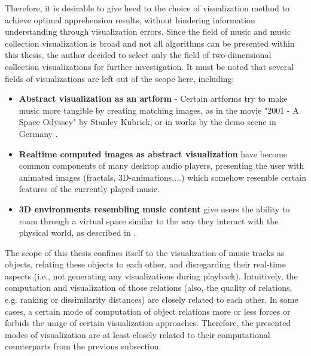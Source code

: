 Therefore, it is desirable to give heed to the choice of visualization method to achieve optimal apprehension results, without hindering information understanding through visualization errors.
Since the field of music and music collection visualization is broad and not all algorithms can be presented within this thesis, the author decided to select only the field of two-dimensional collection visualizations for further investigation. It must be noted that several fields of visualizations are left out of the scope here, including:

\begin{itemize}
	\item \textbf{Abstract visualization as an artform} - Certain artforms try to make music more tangible by creating matching images, as in the movie "2001 - A Space Odyssey" by Stanley Kubrick, or in works by the demo scene in Germany \cite{Scheib:2002}.
	\item \textbf{Realtime computed images as abstract visualization} have become common components of many desktop audio players, presenting the user with animated images (fractals, 3D-animations,...) which somehow resemble certain features of the currently played music.
	\item \textbf{3D environments resembling music content} give users the ability to roam through a virtual space similar to the way they interact with the physical world, as described in \cite{Dittenbach:2007}.
\end{itemize}

The scope of this thesis confines itself to the visualization of music tracks as objects, relating these objects to each other, and disregarding their real-time aspects (i.e., not generating any visualizations during playback).
Intuitively, the computation and visualization of those relations (also, the quality of relations, e.g. ranking or dissimilarity distances) are closely related to each other. In some cases, a certain mode of computation of object relations more or less forces or forbids the usage of certain visualization approaches. Therefore, the presented modes of visualization are at least closely related to their computational counterparts from the previous subsection.

